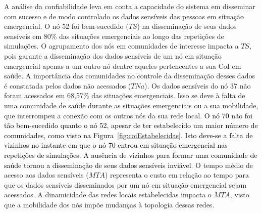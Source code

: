 \documentclass[12pt]{article}
\newcommand{\rev}[1]{\textcolor{black}{{#1}}}
\begin{document}

A análise da confiabilidade 
leva em conta
a capacidade do sistema em disseminar com sucesso e de modo controlado os dados sensíveis das pessoas em situação emergencial.
O nó 52 foi bem-sucedido ($TS$) na disseminação de seus dados sensíveis em 80\% das situações emergenciais ao longo das repetições de simulações.
O agrupamento dos nós em comunidades de interesse impacta
a $TS$, pois garante a disseminação dos dados sensíveis de um nó em situação emergencial apenas a um outro nó dentre aqueles
pertencentes a sua CoI em saúde. A importância das comunidades no controle da
disseminação
desses dados
é constatada pelos dados não acessados ($TNa$). 
Os dados sensíveis do nó 37 não foram acessados em 68,57\% das situações emergenciais.
Isso se deve à
falta de uma comunidade de saúde durante as situações emergenciais ou 
a sua mobilidade, que interrompeu a conexão com os outros nós da sua rede local.
\rev{O nó 70 não foi tão bem-sucedido quanto o nó 52, apesar de ter estabelecido um maior número de comunidades, como 
visto na Figura~\ref{fig:coiEstabelecidas}.
Isto deve-se 
a falta  de vizinhos
no instante em que o nó 70 entrou em situação emergencial nas repetições de simulações.
A ausência de 
vizinhos para formar uma comunidade de saúde  %
tornou a disseminação de seus dados sensíveis inviável.} 
%
O tempo médio de acesso aos dados sensíveis (\textbf{$MTA$}) representa o custo em relação ao tempo para que os dados sensíveis disseminados por um nó em situação emergencial sejam acessados.
A
dinamicidade das redes locais estabelecidas
impacta o \textbf{$MTA$}, visto que
a mobilidade dos nós impõe mudanças à
topologia dessas redes.
\end{document}
